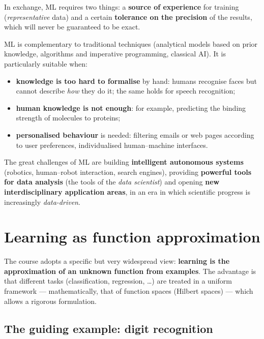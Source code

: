 In exchange, ML requires two things: a \textbf{source of experience}
for training (\emph{representative} data) and a certain
\textbf{tolerance on the precision} of the results, which will never be
guaranteed to be exact.

ML is complementary to traditional techniques (analytical models based
on prior knowledge, algorithms and imperative programming, classical
AI). It is particularly suitable when:

\begin{itemize}
\tightlist
\item
  \textbf{knowledge is too hard to formalise} by hand: humans recognise
  faces but cannot describe \emph{how} they do it; the same holds for
  speech recognition;
\item
  \textbf{human knowledge is not enough}: for example, predicting the
  binding strength of molecules to proteins;
\item
  \textbf{personalised behaviour} is needed: filtering emails or web
  pages according to user preferences, individualised human--machine
  interfaces.
\end{itemize}

The great challenges of ML are building \textbf{intelligent autonomous
systems} (robotics, human--robot interaction, search engines),
providing \textbf{powerful tools for data analysis} (the tools of the
\emph{data scientist}) and opening \textbf{new interdisciplinary
application areas}, in an era in which scientific progress is
increasingly \emph{data-driven}.

\section{Learning as function
approximation}\label{lapprendimento-come-approssimazione-di-funzioni}

The course adopts a specific but very widespread view: \textbf{learning
is the approximation of an unknown function from examples}. The
advantage is that different tasks (classification, regression,
\ldots) are treated in a uniform framework --- mathematically, that of
function spaces (Hilbert spaces) --- which allows a rigorous
formulation.

\subsection{The guiding example: digit
recognition}\label{lesempio-guida-riconoscimento-di-cifre}

